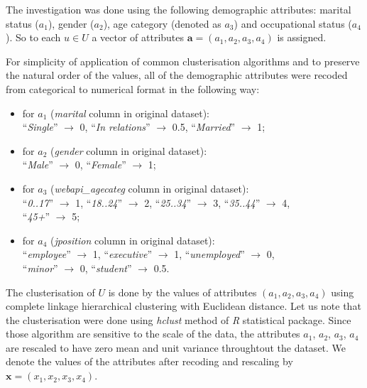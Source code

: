 \documentclass[runningheads,a4paper]{llncs}
\begin{document}
The investigation was done using the following demographic attributes: marital status ($a_1$), gender ($a_2$), age category (denoted as $a_3$) and occupational status ($a_4$). So to each $u \in U$ a vector of attributes $\boldsymbol{a} = (a_1, a_2, a_3, a_4)$ is assigned.

For simplicity of application of common clusterisation algorithms and to preserve the natural order of the values, all of the demographic attributes were recoded from categorical to numerical format in the following way:


\begin{itemize}
\item for $a_1$ (\textit{marital} column in original dataset): \\ 
	``\textit{Single}''  $\to$ 0,  \qquad  ``\textit{In relations}''  $\to$ 0.5, \qquad  ``\textit{Married}''  $\to$ 1;
	\smallskip
	
\item for $a_2$ (\textit{gender} column in original dataset): \\ 
	``\textit{Male}''  $\to$ 0, \qquad  ``\textit{Female}'' $\to$ 1;
	\smallskip
	
\item for $a_3$ (\textit{webapi\_agecateg} column in original dataset): \\ 
	``\textit{0..17}''  $\to$ 1, \qquad  ``\textit{18..24}''  $\to$ 2, \qquad     ``\textit{25..34}''  $\to$ 3, \qquad  ``\textit{35..44}''  $\to$ 4, \\     ``\textit{45+}''  $\to$ 5;
	\smallskip
		
\item for $a_4$ (\textit{jposition} column in original dataset): \\ 
	``\textit{employee}'' $\to$ 1, \qquad  ``\textit{executive}'' $\to$ 1, \qquad  ``\textit{unemployed}'' $\to$ 0, \\  ``\textit{minor}'' $\to$ 0, \qquad  ``\textit{student}'' $\to$ 0.5.
\end{itemize}

The clusterisation of $U$ is done by the values of attributes $(a_1, a_2, a_3, a_4)$ using complete linkage hierarchical clustering \cite{hclust} with Euclidean distance. Let us note that the clusterisation were done using \textit{hclust} method of \textit{R} statistical package. Since those algorithm are sensitive to the scale of the data, the attributes $a_1$, $a_2$, $a_3$, $a_4$ are rescaled to have zero mean and unit variance throughtout the dataset. We denote the values of the attributes after recoding and rescaling by $\boldsymbol{x} = (x_1, x_2, x_3, x_4)$.
\end{document}
